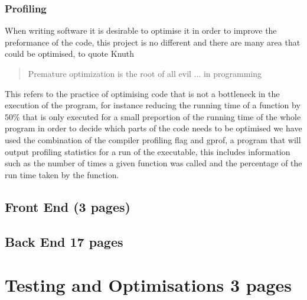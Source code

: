 \subsection{Profiling}
When writing software it is desirable to optimise it in order to improve the preformance of the code, this project
is no different and there are many area that could be optimised, to quote Knuth

\begin{quotation}
{Premature optimization is the root of all evil ... in programming \cite{Knuth74a}}
\end{quotation}

This refers to the practice of optimising code that is not a bottleneck in the execution of the program, for instance
reducing the running time of a function by $50\%$ that is only executed for a small preportion of the running time of
the whole program in order to decide which parts of the code needs to be optimised we have used the combination of
the compiler profiling flag and gprof, a program that will output profiling statistics for a run of the executable,
this includes information such as the number of times a given function was called and the percentage of the run time
taken by the function.

\newpage
\section{Front End (3 pages)}

\newpage
\section{Back End 17 pages}

\newpage
\chapter{Testing and Optimisations 3 pages}


